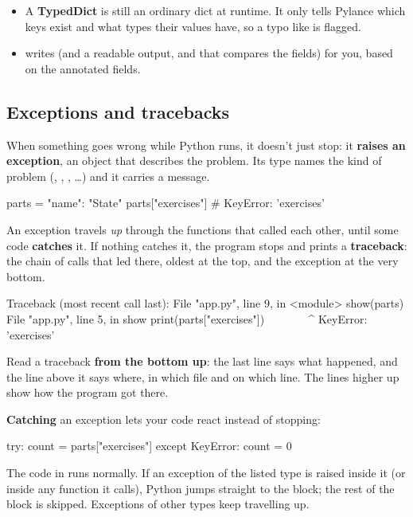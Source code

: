 \begin{itemize}
\item A \textbf{TypedDict} is still an ordinary dict at runtime. It only tells Pylance which keys exist and what types their values have, so a typo like  is flagged.
\item {} writes  (and a readable  output, and \cd{==} that compares the fields) for you, based on the annotated fields.
\end{itemize}

\subsection{Exceptions and tracebacks}

When something goes wrong while Python runs, it doesn't just stop: it \textbf{raises an exception}, an object that describes the problem. Its type names the kind of problem (, , , \ldots) and it carries a message.

\begin{py}
parts = {"name": "State"}
parts["exercises"]           # KeyError: 'exercises'
\end{py}

An exception travels \emph{up} through the functions that called each other, until some code \textbf{catches} it. If nothing catches it, the program stops and prints a \textbf{traceback}: the chain of calls that led there, oldest at the top, and the exception at the very bottom.

\begin{code}
Traceback (most recent call last):
  File "app.py", line 9, in <module>
    show(parts)
  File "app.py", line 5, in show
    print(parts["exercises"])
          ~~~~~^^^^^^^^^^^^^
KeyError: 'exercises'
\end{code}

Read a traceback \textbf{from the bottom up}: the last line says what happened, and the line above it says where, in which file and on which line. The lines higher up show how the program got there.

\textbf{Catching} an exception lets your code react instead of stopping:

\begin{py}
try:
	count = parts["exercises"]
except KeyError:
	count = 0
\end{py}

The code in  runs normally. If an exception of the listed type is raised inside it (or inside any function it calls), Python jumps straight to the  block; the rest of the  block is skipped. Exceptions of other types keep travelling up.

